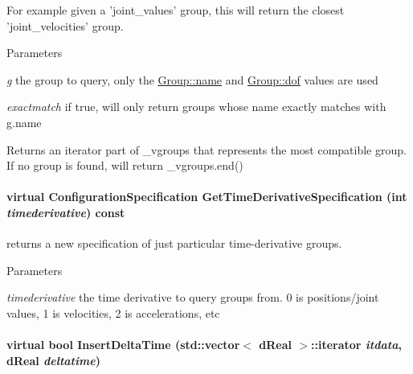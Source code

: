 For example given a 'joint\_\-values' group, this will return the closest 'joint\_\-velocities' group. 
\begin{DoxyParams}{Parameters}
\item[{\em g}]the group to query, only the \hyperlink{classOpenRAVE_1_1ConfigurationSpecification_1_1Group_a9b45b3e13bd9167aab02e17e08916231}{Group::name} and \hyperlink{classOpenRAVE_1_1ConfigurationSpecification_1_1Group_a03745287ca42590ead4a18807041fc66}{Group::dof} values are used \item[{\em exactmatch}]if true, will only return groups whose name exactly matches with g.name \end{DoxyParams}
\begin{DoxyReturn}{Returns}
an iterator part of \_\-vgroups that represents the most compatible group. If no group is found, will return \_\-vgroups.end() 
\end{DoxyReturn}
\hypertarget{classOpenRAVE_1_1ConfigurationSpecification_a74cafdbc27d652fd09ab0c51edfb71c2}{
\paragraph[{GetTimeDerivativeSpecification}]{\setlength{\rightskip}{0pt plus 5cm}virtual {\bf ConfigurationSpecification} GetTimeDerivativeSpecification (int {\em timederivative}) const}\hfill}
\label{classOpenRAVE_1_1ConfigurationSpecification_a74cafdbc27d652fd09ab0c51edfb71c2}


returns a new specification of just particular time-\/derivative groups. 


\begin{DoxyParams}{Parameters}
\item[{\em timederivative}]the time derivative to query groups from. 0 is positions/joint values, 1 is velocities, 2 is accelerations, etc \end{DoxyParams}
\hypertarget{classOpenRAVE_1_1ConfigurationSpecification_acc28b13daf14ef9cba5a7baedea7eb46}{
\paragraph[{InsertDeltaTime}]{\setlength{\rightskip}{0pt plus 5cm}virtual bool InsertDeltaTime (std::vector$<$ dReal $>$::iterator {\em itdata}, \/  dReal {\em deltatime})}\hfill}
\label{classOpenRAVE_1_1ConfigurationSpecification_acc28b13daf14ef9cba5a7baedea7eb46}


